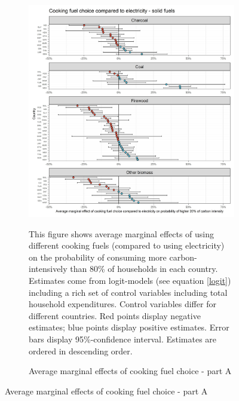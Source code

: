  \begin{figure}[ht!]\ContinuedFloat
   \centering
   \begin{subfigure}[b]{\textwidth}
   \centering
   \caption{Average marginal effects of cooking fuel choice - part A} \label{fig:Logit_ME_CF_1}
   \includegraphics{1_Figures/Analysis_Logit_Models_Marginal_Effects/Average_Marginal_Effects_affected_upper_80_CF_Electricity A_2017.jpg}
   \begin{subcaption2}
     This figure shows average marginal effects of using different cooking fuels (compared to using electricity) on the probability of consuming more carbon-intensively than 80\% of households in each country. Estimates come from logit-models (see equation \ref{logit}) including a rich set of control variables including total household expenditures. Control variables differ for different countries. Red points display negative estimates; blue points display positive estimates. Error bars display 95\%-confidence interval. Estimates are ordered in descending order.
   \end{subcaption2}
   \end{subfigure}
 \end{figure}
 \clearpage

